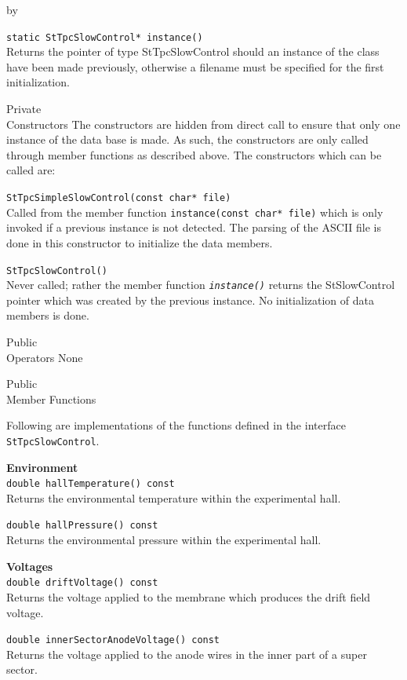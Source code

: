 \documentclass[twoside]{article}
\newcommand{\comp}[1]{\texttt{#1}}%
\newcommand{\entrylabel}[1]{\mbox{\textbf{{#1}}}\hfil}%
\newenvironment{entry}
{\begin{list}{}%
    {\renewcommand{\makelabel}{\entrylabel}%
     \setlength{\labelwidth}{90pt}%
     \setlength{\leftmargin}{\labelwidth}
     \advance\leftmargin by \labelsep%
      }%
    }%
  {\end{list}}
\newcommand{\Entrylabel}[1]%
{\raisebox{0pt}[1ex][0pt]{\makebox[\labelwidth][l]%
    {\parbox[t]{\labelwidth}{\hspace{0pt}\textbf{{#1}}}}}}
\newenvironment{Entry}%
{\renewcommand{\entrylabel}{\Entrylabel}\begin{entry}}%
  {\end{entry}}
\begin{document}
\begin{Entry}
   \verb+static StTpcSlowControl* instance()+\\
   Returns the pointer of type StTpcSlowControl should an instance
   of the class have been made previously, otherwise a filename
   must be specified for the first initialization.

\item[Private \\ Constructors]
   The constructors are hidden from direct call to ensure that
   only one instance of the data base is made.  As such, the
   constructors are only called through member functions
   as described above.  The constructors which can be called are:

   \verb+StTpcSimpleSlowControl(const char* file)+\\
   Called from the member function \texttt{instance(const char* file)}
   which is only invoked if a previous instance is not detected.
   The parsing of the ASCII file is done in this constructor to
   initialize the data members.

   \verb+StTpcSlowControl()+\\
   Never called; rather the member function \texttt{\em instance()}
   returns the StSlowControl pointer which was created by
   the previous instance.  No initialization of data members is done.

\item[Public \\ Operators]
   None

\item[Public \\ Member Functions]

  Following are implementations of the functions defined in
  the interface \comp{StTpcSlowControl}.

  {\bf Environment \\}
  \verb+double hallTemperature() const+\\
  Returns the environmental temperature within the experimental 
  hall.
  
  \verb+double hallPressure() const+\\
  Returns the environmental pressure within the experimental
  hall.
    
  {\bf Voltages \\}
  \verb+double driftVoltage() const+\\
  Returns the voltage applied to the membrane which produces
  the drift field voltage.
    
  \verb+double innerSectorAnodeVoltage() const+\\
  Returns the voltage applied to the anode wires in the
  inner part of a super sector.


\end{Entry}
\end{document}
